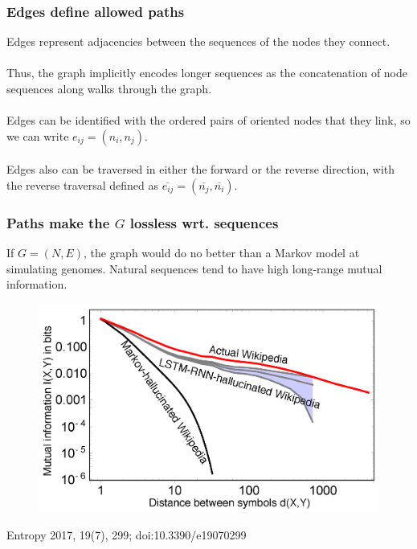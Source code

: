 \documentclass{beamer}
\begin{document}
\begin{frame}
  \frametitle{Edges define allowed paths}
  Edges represent adjacencies between the sequences of the nodes they connect.
  \\~\\
  Thus, the graph implicitly encodes longer sequences as the concatenation of node sequences along walks through the graph.
  \\~\\
  Edges can be identified with the ordered pairs of oriented nodes that they link, so we can write $e_{ij} = (n_i,n_j)$.
  \\~\\
  Edges also can be traversed in either the forward or the reverse direction, with the reverse traversal defined as $\overline{e_{ij}} = (\overline{n_j},\overline{n_i})$.
\end{frame}

\begin{frame}
  \frametitle{Paths make the $G$ lossless wrt. sequences}
  If $G = (N, E)$, the graph would do no better than a Markov model at simulating genomes.
  Natural sequences tend to have high long-range mutual information.
  \begin{figure}
    \includegraphics[scale=1,center]{entropy-19-00299-g003.png}
  \end{figure}

  \begin{flushright}
  \tiny{Entropy 2017, 19(7), 299; doi:10.3390/e19070299}
    \end{flushright}
\end{frame}
\end{document}

